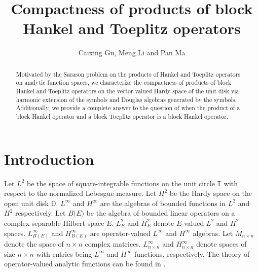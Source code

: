\documentclass{article}%
\begin{document}
\date{}
\title{Compactness of products of block Hankel and Toeplitz operators}
\author{Caixing Gu, Meng Li and Pan Ma}
\maketitle

\begin{abstract}
Motivated by the Sarason problem on the products of Hankel and Toeplitz
operators on analytic function spaces, we characterize the compactness of
products of block Hankel and Toeplitz operators on the vector-valued Hardy
space of the unit disk via harmonic extension of the symbols and Douglas
algebras generated by the symbols. Additionally, we provide a complete answer
to the question of when the product of a block Hankel operator and a block
Toeplitz operator is a block Hankel operator.

\end{abstract}

\section{Introduction}

Let $L^{2}$ be the space of square-integrable functions on the unit circle
$\mathbb{T}$ with respect to the normalized Lebesgue measure. Let $H^{2}$ be
the Hardy space on the open unit disk $\mathbb{D}$. $L^{\infty}$ and
$H^{\infty}$ are the algebras of bounded functions in $L^{2}$ and $H^{2}$
respectively. Let $B(E\mathcal{)}$ be the algebra of bounded linear operators
on a complex separable Hilbert space $E$. $L_{E}^{2}$ and $H_{E}^{2}$ denote
$E$-valued $L^{2}$ and $H^{2}$ spaces. $L_{B(E)}^{\infty}$ and $H_{B(E)}%
^{\infty}$ are operator-valued $L^{\infty}$ and $H^{\infty}$ algebras. Let
$M_{n\times n}$ denote the space of $n\times n$ complex matrices. $L_{n\times
n}^{\infty}$ and $H_{n\times n}^{\infty}$ denote spaces of size $n\times n$
with entries being $L^{\infty}$ and $H^{\infty}$ functions, respectively. The
theory of operator-valued analytic functions can be found in \cite[Section V]{NFBK}.
\end{document}
